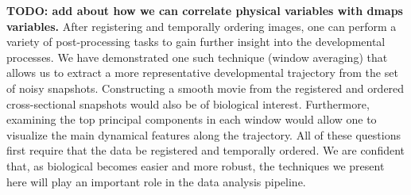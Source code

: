 \documentclass{pnastwo}
\begin{document}
\begin{article}
{\bf TODO: add about how we can correlate physical variables with dmaps variables.}
%
After registering and temporally ordering images, one can perform a variety of post-processing tasks to gain further insight into the developmental processes.
%
We have demonstrated one such technique (window averaging) that allows us to extract a more representative developmental trajectory from the set of noisy snapshots. 
%
Constructing a smooth movie from the registered and ordered cross-sectional snapshots would also be of biological interest.
%
Furthermore, examining the top principal components in each window would allow one to visualize the main dynamical features along the trajectory.
%
All of these questions first require that the data be registered and temporally ordered.
%
We are confident that, as biological becomes easier and more robust, the techniques we present here will play an important role in the data analysis pipeline. 


 






\end{article}
\end{document}
